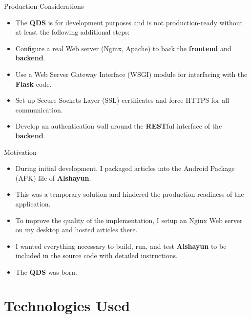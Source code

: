 \documentclass{beamer}
\begin{document}
\begin{frame}{Production Considerations}
    \begin{itemize}
        \item The \textbf{QDS} is for development purposes and is not
            production-ready without at least the following additional steps:
        \item Configure a real Web server (Nginx, Apache) to back the
            \textbf{frontend} and \textbf{backend}.
        \item Use a Web Server Gateway Interface (WSGI) module for interfacing
            with the \textbf{Flask} code.
        \item Set up Secure Sockets Layer (SSL) certificates and force HTTPS for
            all communication.
        \item Develop an authentication wall around the \textbf{REST}ful
            interface of the \textbf{backend}.
    \end{itemize}
\end{frame}

\begin{frame}{Motivation}
    \begin{itemize}
        \item During initial development, I packaged articles into the Android
            Package (APK) file of \textbf{Alshayun}.
        \item This was a temporary solution and hindered the
            production-readiness of the application.
        \item To improve the quality of the implementation, I setup an Nginx Web
            server on my desktop and hosted articles there.
        \item I wanted everything necessary to build, run, and test
            \textbf{Alshayun} to be included in the source code with detailed
            instructions.
        \item The \textbf{QDS} was born.
    \end{itemize}
\end{frame}

\section{Technologies Used}
\end{document}
